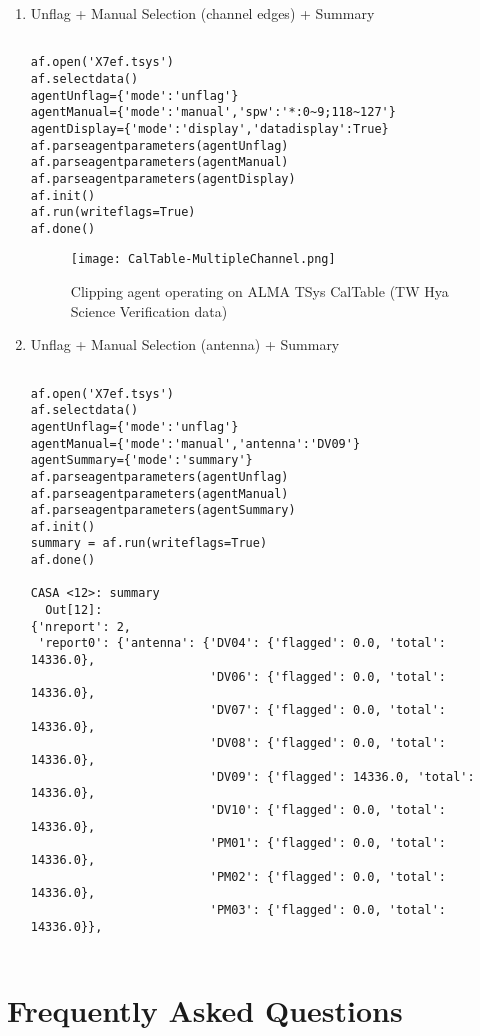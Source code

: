 \begin{enumerate}
\item Unflag + Manual Selection (channel edges) + Summary
\begin{verbatim}

af.open('X7ef.tsys')
af.selectdata()
agentUnflag={'mode':'unflag'}
agentManual={'mode':'manual','spw':'*:0~9;118~127'}
agentDisplay={'mode':'display','datadisplay':True}
af.parseagentparameters(agentUnflag)
af.parseagentparameters(agentManual)
af.parseagentparameters(agentDisplay)
af.init()
af.run(writeflags=True)
af.done() 

\end{verbatim}

\begin{figure}
\texttt{[image: CalTable-MultipleChannel.png]}
\caption{Clipping agent operating on ALMA TSys CalTable (TW Hya Science
Verification data)}
\label{Fig:TW Hya CalTable Clip}
\end{figure}

\item Unflag + Manual Selection (antenna) + Summary
\begin{verbatim}

af.open('X7ef.tsys')
af.selectdata()
agentUnflag={'mode':'unflag'}
agentManual={'mode':'manual','antenna':'DV09'}
agentSummary={'mode':'summary'}
af.parseagentparameters(agentUnflag)
af.parseagentparameters(agentManual)
af.parseagentparameters(agentSummary)
af.init()
summary = af.run(writeflags=True)
af.done() 

CASA <12>: summary
  Out[12]: 
{'nreport': 2,
 'report0': {'antenna': {'DV04': {'flagged': 0.0, 'total': 14336.0},
                         'DV06': {'flagged': 0.0, 'total': 14336.0},
                         'DV07': {'flagged': 0.0, 'total': 14336.0},
                         'DV08': {'flagged': 0.0, 'total': 14336.0},
                         'DV09': {'flagged': 14336.0, 'total': 14336.0},
                         'DV10': {'flagged': 0.0, 'total': 14336.0},
                         'PM01': {'flagged': 0.0, 'total': 14336.0},
                         'PM02': {'flagged': 0.0, 'total': 14336.0},
                         'PM03': {'flagged': 0.0, 'total': 14336.0}},


\end{verbatim}

\end{enumerate}


\section{Frequently Asked Questions}


